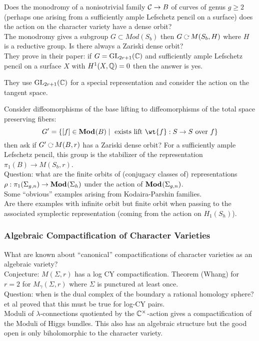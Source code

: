 \documentclass[12pt]{article}
\begin{document}
Does the monodromy of a nonisotrivial family $\mathcal{C} \to B$ of curves of genus $g \ge 2$ (perhaps one arising from a sufficiently ample Lefschetz pencil on a surface) does the action on the character variety have a dense orbit?
\\
The monodromy gives a subgroup $G \subset Mod(S_b)$ then $G \acts M(S_b, H)$ where $H$ is a reductive group. Is there always a Zariski dense orbit? 
\\
They prove in their paper: if $G = \mathrm{GL}_{2r+1}(\mathbb{C})$ and sufficiently ample Lefschetz pencil on a surface $X$ with $H^1(X, \mathbb{Q}) = 0$ then the answer is yes. 

\begin{rmk}
They use $\mathrm{GL}_{2r+1}(\mathbb{C})$ for a special representation and consider the action on the tangent space. 
\end{rmk}

Consider diffeomorphisms of the base lifting to diffeomorphisms of the total space preserving fibers: 
\[ G' = \{ [f] \in \Mod{}(B) \mid \text{ exists lift } \wt{f} : S \to S \text{ over } f \} \]
then ask if $G' \acts M(B, r)$ has a Zariski dense orbit? For a sufficiently ample Lefschetz pencil, this group is the stabilizer of the representation $\pi_1(B) \to M(S_b, r)$.  
\\
Question: what are the finite orbits of (conjugacy classes of) representations $\rho : \pi_1(\Sigma_{g,n}) \to \mathbf{Mod}_{}(\Sigma_h)$ under the action of $\mathbf{Mod}_{}(\Sigma_{g,n})$.
\\
Some ``obvious'' examples arising from Kodaira-Parshin families.
\\
Are there examples with infinite orbit but finite orbit when passing to the associated symplectic representation (coming from the action on $H_1(S_h)$).

\subsubsection{Algebraic Compactification of Character Varieties}

What are known about ``canonical'' compactifications of character varieties as an algebraic variety? 
\\
Conjecture: $M(\Sigma, r)$ has a log CY compactification. Theorem (Whang) for $r = 2$ for $M_\gamma(\Sigma, r)$ where $\Sigma$ is punctured at least once. 
\\
Question: when is the dual complex of the boundary a rational homology sphere? \Kollar et al proved that this must be true for log-CY pairs.
\\
Moduli of $\lambda$-connections quotiented by the $\mathbb{C}^\times$-action gives a compactification of the Moduli of Higgs bundles. This also has an algebraic structure but the good open is only biholomorphic to the character variety.
\end{document}
